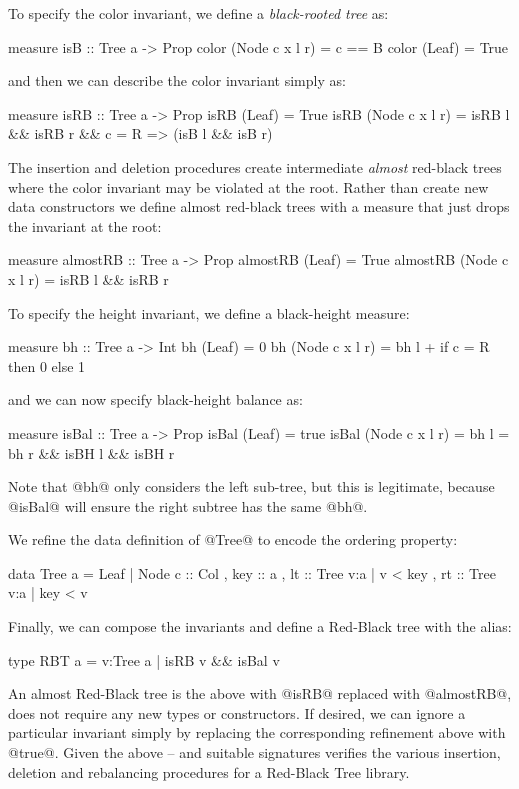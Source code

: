 To specify the color invariant, we define a \emph{black-rooted tree} as:
%
\begin{code}
  measure isB           :: Tree a -> Prop 
  color (Node c x l r)  = c == B
  color (Leaf)          = True
\end{code}
%
and then we can describe the color invariant simply as:
%
\begin{code}
  measure isRB        :: Tree a -> Prop
  isRB (Leaf)         = True
  isRB (Node c x l r) = isRB l && isRB r &&
                        c = R => (isB l && isB r)
\end{code}
%
The insertion and deletion procedures create intermediate \emph{almost} 
red-black trees where the color invariant may be violated at the root. 
Rather than create new data constructors we define almost red-black 
trees with a measure that just drops the invariant at the root:
%
\begin{code}
  measure almostRB        :: Tree a -> Prop
  almostRB (Leaf)         = True
  almostRB (Node c x l r) = isRB l && isRB r
\end{code}

To specify the height invariant, we define a black-height measure:
%
\begin{code}
  measure bh        :: Tree a -> Int
  bh (Leaf)         = 0
  bh (Node c x l r) = bh l + if c = R then 0 else 1
\end{code}
%
and we can now specify black-height balance as:
%
\begin{code}
  measure isBal        :: Tree a -> Prop
  isBal (Leaf)         = true
  isBal (Node c x l r) = bh l = bh r 
                       && isBH l && isBH r 
\end{code}
%
Note that @bh@ only considers the left sub-tree, 
but this is legitimate, because @isBal@ will 
ensure the right subtree has the same @bh@.

We refine the data definition of @Tree@ 
to encode the ordering property:
%
\begin{code}
  data Tree a
    = Leaf
    | Node { c   :: Col
           , key :: a
           , lt  :: Tree {v:a | v < key }
           , rt  :: Tree {v:a | key < v } }
\end{code}
%

Finally, we can compose the invariants and define a 
Red-Black tree with the alias:
%
\begin{code}
  type RBT a = {v:Tree a | isRB v && isBal v}
\end{code}
%
An almost Red-Black tree is the above with @isRB@ 
replaced with @almostRB@, \ie does not require any 
new types or constructors.
If desired, we can ignore a particular invariant 
simply by replacing the corresponding refinement 
above with @true@.
Given the above -- and suitable signatures \toolname 
verifies the various insertion, deletion and rebalancing
procedures for a Red-Black Tree library.

